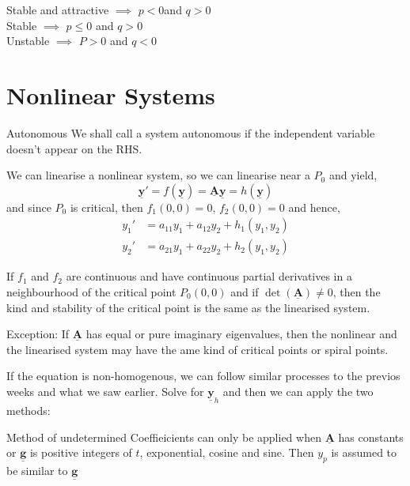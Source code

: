 \documentclass{article}
\renewcommand{\vec}[1]{\underline{\textbf{#1}}}
\begin{document}
Stable and attractive $\implies$ $p<0$and $ q>0$\\
Stable $\implies$ $p \le 0 $ and $ q>0$\\
Unstable $\implies$ $P>0 $ and $ q<0$\\

\section{Nonlinear Systems}
\noindent\begin{definition}{Autonomous}{}
  We shall call a system autonomous if the independent variable doesn't appear on the RHS.
\end{definition}\vspace{10pt}

We can linearise a nonlinear system, so we can linearise near a $P_0$ and yield, $$ \vec y' = f(\vec y) = \vec A \vec y = h(\vec y) $$
and since $P_0$ is critical, then $f_1(0, 0) = 0$, $f_2(0, 0) = 0$ and hence,
\begin{align*}
  y_1' &= a_{11}y_1 + a_{12}y_2 + h_1(y_1, y_2)\\
  y_2' &= a_{21}y_1 + a_{22}y_2 + h_2(y_1, y_2)
\end{align*}

\noindent\begin{theorem}{}{}
   If $f_1$ and $f_2$ are continuous and have continuous partial derivatives in a neighbourhood of the critical point $P_0(0, 0)$ and if $\det(\vec A)\neq 0$, then the kind and stability of the critical point is the same as the linearised system.
\end{theorem}\vspace{10pt}

Exception: If $\vec A$ has equal or pure imaginary eigenvalues, then the nonlinear and the linearised system may have the ame kind of critical points or spiral points.


If the equation is non-homogenous, we can follow similar processes to the previos weeks and what we saw earlier. Solve for $\vec y_h$ and then we can apply the two methods:

Method of undetermined Coeffieicients can only be applied when $\vec A$ has constants or $\vec g$ is positive integers of $t$, exponential, cosine and sine. Then $y_p$ is assumed to be similar to $\vec g$
\end{document}
